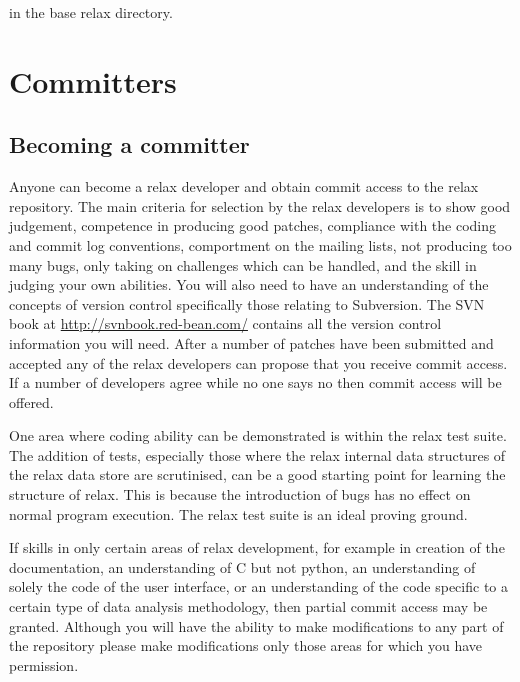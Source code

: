 
in the base relax directory.




\section{Committers}


\subsection{Becoming a committer}\label{becoming a committer}

Anyone can become a relax developer and obtain commit access to the relax repository.
The main criteria for selection by the relax developers is to show good judgement, competence in producing good patches, compliance with the coding and commit log conventions, comportment on the mailing lists, not producing too many bugs, only taking on challenges which can be handled, and the skill in judging your own abilities.
You will also need to have an understanding of the concepts of version control specifically those relating to Subversion.
The SVN book at \href{http://svnbook.red-bean.com/}{http://svnbook.red-bean.com/} contains all the version control information you will need.
After a number of patches have been submitted and accepted any of the relax developers can propose that you receive commit access.
If a number of developers agree while no one says no then commit access will be offered.

One area where coding ability can be demonstrated is within the relax test suite.
The addition of tests, especially those where the relax internal data structures of the relax data store are scrutinised, can be a good starting point for learning the structure of relax.
This is because the introduction of bugs has no effect on normal program execution.
The relax test suite is an ideal proving ground.

If skills in only certain areas of relax development, for example in creation of the documentation, an understanding of C but not python, an understanding of solely the code of the user interface, or an understanding of the code specific to a certain type of data analysis methodology, then partial commit access may be granted.
Although you will have the ability to make modifications to any part of the repository please make modifications only those areas for which you have permission.



